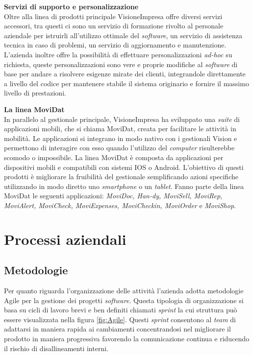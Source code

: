 \textbf{Servizi di supporto e personalizzazione}\\
Oltre alla linea di prodotti principale VisioneImpresa offre diversi servizi accessori, tra questi ci sono un servizio di formazione rivolto al personale aziendale per istruirli all'utilizzo ottimale del \textit{software}, un servizio di assistenza tecnica in caso di problemi, un servizio di aggiornamento e manutenzione.
L'azienda inoltre offre la possibilità di effettuare personalizzazioni \textit{ad-hoc} su richiesta, queste personalizzazioni sono vere e proprie modifiche al \textit{software} di base per andare a risolvere esigenze mirate dei clienti, integrandole direttamente a livello del codice per mantenere stabile il sistema originario e fornire il massimo livello di prestazioni.


\textbf{La linea MoviDat}\\
In parallelo al gestionale principale, VisioneImpresa ha sviluppato una \textit{suite} di applicazioni mobili, che si chiama MoviDat, creata per facilitare le attività in mobilità. Le applicazioni si integrano in modo nativo con i gestionali Vision e permettono di interagire con esso quando l'utilizzo del \textit{computer} risulterebbe scomodo o impossibile. 
La linea MoviDat è composta da applicazioni per dispositivi mobili e compatibili con sistemi IOS o Android. L'obiettivo di questi prodotti è migliorare la fruibilità del gestionale semplificando azioni specifiche utilizzando in modo diretto uno \textit{smartphone} o un \textit{tablet}.
Fanno parte della linea MoviDat le seguenti applicazioni: \textit{MoviDoc, Han-dy, MoviSell, MoviRep, MoviAlert, MoviCheck, MoviExpenses, MoviCheckin,
MoviOrder} e \textit{MoviShop}.


\section{Processi aziendali}

\subsection{Metodologie}
Per quanto riguarda l'organizzazione delle attività l'azienda adotta metodologie Agile per la gestione dei progetti \textit{software}. Questa tipologia di organizzazione si basa su cicli di lavoro brevi e ben definiti chiamati \textit{sprint} la cui struttura può essere visualizzata nella figura \ref{fig:Agile}. 
Questi \textit{sprint} consentono al \textit{team} di adattarsi in maniera rapida ai cambiamenti concentrandosi nel migliorare il prodotto in maniera progressiva favorendo la comunicazione continua e riducendo il rischio di disallineamenti interni.

